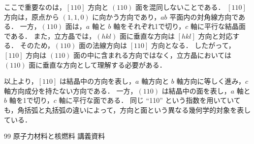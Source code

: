 \documentclass[titlepage,a4paper]{jsarticle}
\begin{document}
ここで重要なのは，$[110]$ 方向と $(110)$ 面を混同しないことである．
$[110]$ 方向は，原点から $(1,1,0)$ に向かう方向であり，$ab$ 平面内の対角線方向である．
一方，$(110)$ 面は，$a$ 軸と $b$ 軸をそれぞれ1で切り，$c$ 軸に平行な結晶面である．
また，立方晶では，$(hkl)$ 面に垂直な方向は $[hkl]$ 方向と対応する．
そのため，$(110)$ 面の法線方向は $[110]$ 方向となる．
したがって，$[110]$ 方向は $(110)$ 面の中に含まれる方向ではなく，立方晶においては $(110)$ 面に垂直な方向として理解する必要がある．

以上より，$[110]$ は結晶中の方向を表し，$a$ 軸方向と $b$ 軸方向に等しく進み，$c$ 軸方向成分を持たない方向である．
一方，$(110)$ は結晶中の面を表し，$a$ 軸と $b$ 軸を1で切り，$c$ 軸に平行な面である．
同じ ``110'' という指数を用いていても，角括弧と丸括弧の違いによって，方向と面という異なる幾何学的対象を表している．

\begin{thebibliography}{99}
原子力材料と核燃料 講義資料
\end{thebibliography}
\end{document}

